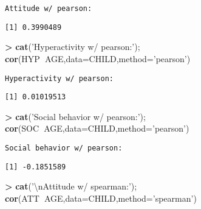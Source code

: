 \documentclass[]{article}
\newenvironment{Shaded}{\begin{snugshade}}{\end{snugshade}}
\newcommand{\KeywordTok}[1]{\textcolor[rgb]{0.13,0.29,0.53}{\textbf{#1}}}
\newcommand{\DataTypeTok}[1]{\textcolor[rgb]{0.13,0.29,0.53}{#1}}
\newcommand{\CharTok}[1]{\textcolor[rgb]{0.31,0.60,0.02}{#1}}
\newcommand{\StringTok}[1]{\textcolor[rgb]{0.31,0.60,0.02}{#1}}
\newcommand{\OperatorTok}[1]{\textcolor[rgb]{0.81,0.36,0.00}{\textbf{#1}}}
\newcommand{\NormalTok}[1]{#1}
\begin{document}
\begin{verbatim}
Attitude w/ pearson:
\end{verbatim}

\begin{verbatim}
[1] 0.3990489
\end{verbatim}

\begin{Shaded}
\begin{Highlighting}[]
\OperatorTok{>}\StringTok{ }\KeywordTok{cat}\NormalTok{(}\StringTok{'Hyperactivity w/ pearson:'}\NormalTok{); }\KeywordTok{cor}\NormalTok{(HYP}\OperatorTok{~}\NormalTok{AGE,}\DataTypeTok{data=}\NormalTok{CHILD,}\DataTypeTok{method=}\StringTok{'pearson'}\NormalTok{)}
\end{Highlighting}
\end{Shaded}

\begin{verbatim}
Hyperactivity w/ pearson:
\end{verbatim}

\begin{verbatim}
[1] 0.01019513
\end{verbatim}

\begin{Shaded}
\begin{Highlighting}[]
\OperatorTok{>}\StringTok{ }\KeywordTok{cat}\NormalTok{(}\StringTok{'Social behavior w/ pearson:'}\NormalTok{); }\KeywordTok{cor}\NormalTok{(SOC}\OperatorTok{~}\NormalTok{AGE,}\DataTypeTok{data=}\NormalTok{CHILD,}\DataTypeTok{method=}\StringTok{'pearson'}\NormalTok{)}
\end{Highlighting}
\end{Shaded}

\begin{verbatim}
Social behavior w/ pearson:
\end{verbatim}

\begin{verbatim}
[1] -0.1851589
\end{verbatim}

\begin{Shaded}
\begin{Highlighting}[]
\OperatorTok{>}\StringTok{ }\KeywordTok{cat}\NormalTok{(}\StringTok{'}\CharTok{\textbackslash{}n}\StringTok{Attitude w/ spearman:'}\NormalTok{); }\KeywordTok{cor}\NormalTok{(ATT}\OperatorTok{~}\NormalTok{AGE,}\DataTypeTok{data=}\NormalTok{CHILD,}\DataTypeTok{method=}\StringTok{'spearman'}\NormalTok{)}
\end{Highlighting}
\end{Shaded}
\end{document}
